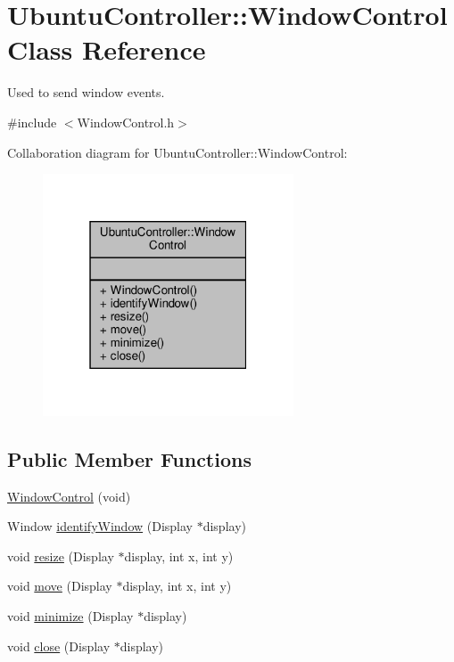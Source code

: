 \hypertarget{class_ubuntu_controller_1_1_window_control}{}\section{Ubuntu\+Controller\+:\+:Window\+Control Class Reference}
\label{class_ubuntu_controller_1_1_window_control}


Used to send window events.  




{\ttfamily \#include $<$Window\+Control.\+h$>$}



Collaboration diagram for Ubuntu\+Controller\+:\+:Window\+Control\+:
\nopagebreak
\begin{figure}[H]
\begin{center}
\leavevmode
\includegraphics[width=211pt]{class_ubuntu_controller_1_1_window_control__coll__graph}
\end{center}
\end{figure}
\subsection*{Public Member Functions}
\begin{DoxyCompactItemize}
\item 
\hyperlink{class_ubuntu_controller_1_1_window_control_ac1737a56defaa8f60f53054b2167fee8}{Window\+Control} (void)
\item 
Window \hyperlink{class_ubuntu_controller_1_1_window_control_aad092a22b19664df4d94fe9a853d350a}{identify\+Window} (Display $\ast$display)
\item 
void \hyperlink{class_ubuntu_controller_1_1_window_control_a131a982c3338be4187ac6611591e042f}{resize} (Display $\ast$display, int x, int y)
\item 
void \hyperlink{class_ubuntu_controller_1_1_window_control_a367c48d4f217a83225c8ade45e347884}{move} (Display $\ast$display, int x, int y)
\item 
void \hyperlink{class_ubuntu_controller_1_1_window_control_abb8d0ae3c43be976259181c848fa4568}{minimize} (Display $\ast$display)
\item 
void \hyperlink{class_ubuntu_controller_1_1_window_control_a2f521062be8be113d1cbcca4f495d693}{close} (Display $\ast$display)
\end{DoxyCompactItemize}


